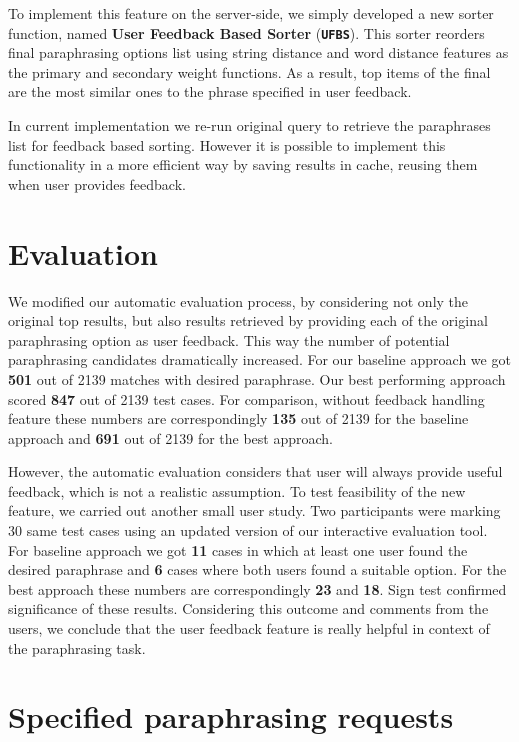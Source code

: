 To implement this feature on the server-side, we simply developed a new sorter function, named \textbf{User Feedback Based Sorter} (\texttt{\textbf{UFBS}}). This sorter reorders final paraphrasing options list using string distance and word distance features as the primary and secondary weight functions. As a result, top items of the final are the most similar ones to the phrase specified in user feedback. 

In current implementation we re-run original query to retrieve the paraphrases list for feedback based sorting. However it is possible to implement this functionality in a more efficient way by saving results in cache, reusing them when user provides feedback. 

\section{Evaluation}

We modified our automatic evaluation process, by considering not only the original top results, but also results retrieved by providing each of the original paraphrasing option as user feedback. This way the number of potential paraphrasing candidates dramatically increased. For our baseline approach we got \textbf{501} out of 2139 matches with desired paraphrase. Our best performing approach scored \textbf{847} out of 2139 test cases. For comparison, without feedback handling feature these numbers are correspondingly \textbf{135} out of 2139 for the baseline approach and \textbf{691} out of 2139 for the best approach.

However, the automatic evaluation considers that user will always provide useful feedback, which is not a realistic assumption. To test feasibility of the new feature, we carried out another small user study. Two participants were marking 30 same test cases using an updated version of our interactive evaluation tool. For baseline approach we got \textbf{11} cases in which at least one user found the desired paraphrase and \textbf{6} cases where both users found a suitable option. For the best approach these numbers are correspondingly \textbf{23} and \textbf{18}. Sign test confirmed significance of these results. Considering this outcome and comments from the users, we conclude that the user feedback feature is really helpful in context of the  paraphrasing task.

\section{Specified paraphrasing requests}

